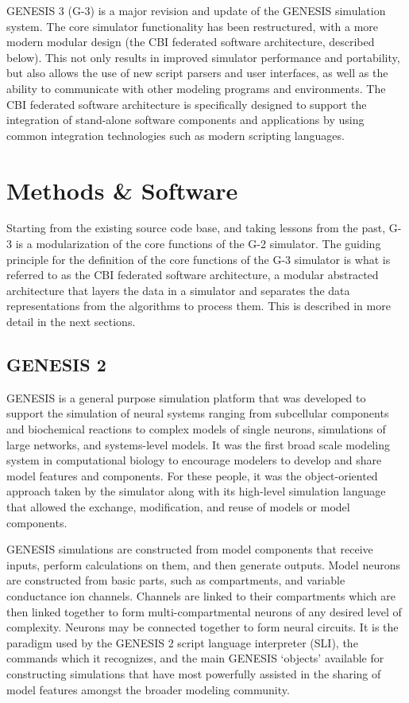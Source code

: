 \documentclass[12pt]{article}
\begin{document}
GENESIS 3 (G-3) is a major revision and update of the GENESIS
simulation system.  The core simulator functionality has been
restructured, with a more modern modular design (the CBI federated
software architecture, described below).  This not only results in
improved simulator performance and portability, but also allows the
use of new script parsers and user interfaces, as well as the ability
to communicate with other modeling programs and environments.  The CBI
federated software architecture is specifically designed to support
the integration of stand-alone software components and applications by
using common integration technologies such as modern scripting
languages.


\section{Methods \& Software}

Starting from the existing source code base, and taking lessons from
the past, G-3 is a modularization of the core functions of the G-2
simulator.  The guiding principle for the definition of the core
functions of the G-3 simulator is what is referred to as the CBI
federated software architecture, a modular abstracted architecture
that layers the data in a simulator and separates the data
representations from the algorithms to process them.  This is
described in more detail in the next sections.

\subsection{GENESIS 2}
\label{sec:genesis}
GENESIS is a general purpose simulation
platform that was developed to support the simulation of neural
systems ranging from subcellular components and biochemical reactions
to complex models of single neurons, simulations of large networks,
and systems-level models. It was the first broad scale modeling system
in computational biology to encourage modelers to develop and share
model features and components. For these people, it was the
object-oriented approach taken by the simulator along with its
high-level simulation language that allowed the exchange,
modification, and reuse of models or model
components. 

GENESIS simulations are constructed from model components that receive
inputs, perform calculations on them, and then generate outputs. Model
neurons are constructed from basic parts, such as compartments, and
variable conductance ion channels. Channels are linked to their
compartments which are then linked together to form
multi-compartmental neurons of any desired level of complexity.
Neurons may be connected together to form neural circuits.  It is the
paradigm used by the GENESIS 2 script language interpreter (SLI), the
commands which it recognizes, and the main GENESIS `objects' available
for constructing simulations that have most powerfully assisted in the
sharing of model features amongst the broader modeling community.
\end{document}
